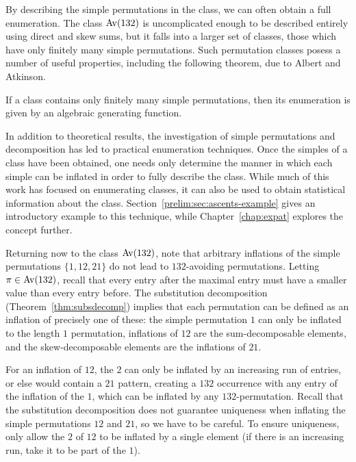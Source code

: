     By describing the simple permutations in the class, we can often obtain a
    full enumeration. The class $\operatorname{{Av}} (132)$ is uncomplicated enough to be
    described entirely using direct and skew sums, but it falls into a larger
    set of classes, those which have only finitely many simple permutations.
    Such permutation classes posess a number of useful properties, including
    the following theorem, due to Albert and Atkinson. 

    \begin{theorem}
      If a class contains only finitely many simple permutations, then its
      enumeration is given by an algebraic generating function. 
    \end{theorem}

    In addition to theoretical results, the investigation of simple
    permutations and decomposition has led to practical enumeration techniques.
    Once the simples of a class have been obtained, one needs only determine
    the manner in which each simple can be inflated in order to fully describe
    the class. While much of this work has focused on enumerating classes, it
    can also be used to obtain statistical information about the class.
    Section~\ref{prelim:sec:ascents-example} gives an introductory example to
    this technique, while Chapter~\ref{chap:expat} explores the concept
    further. 

    Returning now to the class $\operatorname{{Av}}(132)$, note that arbitrary inflations of
    the simple permutations $\{1, 12, 21\}$ do not lead to $132$-avoiding
    permutations. Letting $\pi \in \operatorname{{Av}}(132)$, recall that every entry after the
    maximal entry must have a smaller value than every entry before. The
    substitution decomposition (Theorem~\ref{thm:subsdecomp}) implies that 
    each permutation can be defined as an inflation of precisely one of these:
    the simple permutation $1$ can only be inflated to the length $1$
    permutation, inflations of
    $12$ are the sum-decomposable elements, and the skew-decomposable elements
    are the inflations of $21$. 
    
    For an inflation of $12$, the $2$ can only be inflated by an
    increasing run of entries, or else would contain a $21$ pattern, creating a
    $132$ occurrence with any entry of the inflation of the $1$, which can be
    inflated by any $132$-permutation.  Recall that the substitution
    decomposition does not guarantee uniqueness when inflating the simple
    permutations $12$ and $21$, so we have to be careful. To ensure uniqueness,
    only allow the $2$ of $12$ to be inflated by a single element (if there is
    an increasing run, take it to be part of the $1$). 


